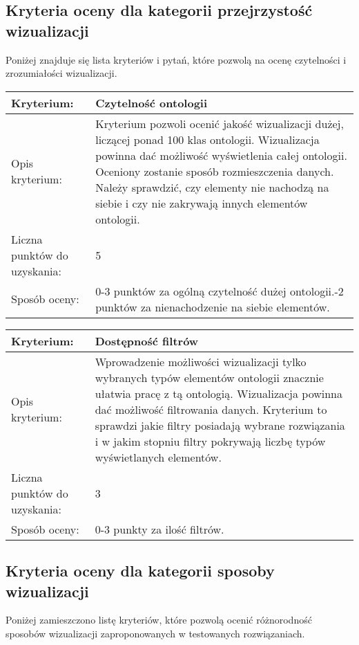 \subsection*{Kryteria oceny dla kategorii przejrzystość wizualizacji}
Poniżej znajduje się lista kryteriów i pytań, które pozwolą na ocenę czytelności i zrozumiałości wizualizacji. 


\begin{longtable}{|m{3cm}|m{10cm}|}\hline
Kryterium:                   & \bf{ Czytelność ontologii }\\ \hline
Opis kryterium:              &  Kryterium pozwoli ocenić jakość wizualizacji dużej, liczącej ponad 100 klas ontologii. Wizualizacja powinna dać możliwość 
                                wyświetlenia całej ontologii.  Oceniony zostanie sposób rozmieszczenia 
                                 danych. Należy sprawdzić, czy elementy nie nachodzą na siebie i czy nie zakrywają innych elementów ontologii. 
                                \\ \hline
Liczna punktów do uzyskania: &  5   \\ \hline
Sposób oceny:                &  0-3 punktów za ogólną czytelność dużej ontologii.\newline
                                0-2 punktów za nienachodzenie na siebie elementów. \\ \hline
\end{longtable}

\begin{longtable}{|m{3cm}|m{10cm}|}\hline
Kryterium:                   & \bf{ Dostępność filtrów }\\ \hline
Opis kryterium:              &  Wprowadzenie możliwości wizualizacji tylko wybranych typów elementów ontologii znacznie ułatwia pracę z tą ontologią.
                                Wizualizacja powinna dać możliwość filtrowania danych. Kryterium to sprawdzi jakie filtry posiadają wybrane 
                                rozwiązania i w jakim stopniu filtry pokrywają liczbę typów wyświetlanych elementów.\\ \hline
Liczna punktów do uzyskania: &  3   \\ \hline
Sposób oceny:                &  0-3 punkty za ilość filtrów.    \\ \hline
\end{longtable}


\subsection*{Kryteria oceny dla kategorii sposoby wizualizacji}
Poniżej zamieszczono listę kryteriów, które pozwolą ocenić różnorodność sposobów wizualizacji zaproponowanych w testowanych rozwiązaniach. 


